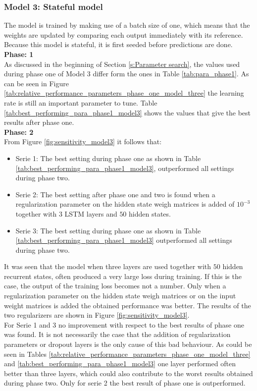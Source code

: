 \newpage
\subsubsection{Model 3: Stateful model}
The model is trained by making use of a batch size of one, which means that the weights are updated by comparing each output immediately with its reference. Because this model is stateful, it is first seeded before predictions are done.\\

\textbf{Phase: 1}\\
As discussed in the beginning of Section \ref{s:Parameter search}, the values used during phase one of Model 3 differ form the ones in Table \ref{tab:para_phase1}. As can be seen in Figure \ref{tab:relative_performance_parameters_phase_one_model_three} the learning rate is still an important parameter to tune. Table \ref{tab:best_performing_para_phase1_model3} shows the values that give the best results after phase one.\\ 

\textbf{Phase: 2}\\
From Figure \ref{fig:sensitivity_model3} it follows that:
\begin{itemize}
	\item Serie 1: The best setting during phase one as shown in Table \ref{tab:best_performing_para_phase1_model3}, outperformed all settings during phase two. 
	\item Serie 2: The best setting after phase one and two is found when a regularization parameter on the hidden state weigh matrices is added of $ 10^{-3} $ together with $ 3 $ LSTM layers and $ 50 $ hidden states.
	\item Serie 3: The best setting during phase one as shown in Table \ref{tab:best_performing_para_phase1_model3} outperformed all settings during phase two. 
\end{itemize}

It was seen that the model when three layers are used together with $ 50 $ hidden recurrent states, often produced a very large loss during training. If this is the case, the output of the training loss becomes not a number. Only when a regularization parameter on the hidden state weigh matrices or on the input weight matrices is added the obtained performance was better. The results of the two regularizers are shown in Figure \ref{fig:sensitivity_model3}.\\

For Serie 1 and 3 no improvement with respect to the best results of phase one was found. It is not necessarily the case that the addition of regularization parameters or dropout layers is the only cause of this bad behaviour. As could be seen in Tables \ref{tab:relative_performance_parameters_phase_one_model_three} and \ref{tab:best_performing_para_phase1_model3} one layer performed often better than three layers, which could also contribute to the worst results obtained during phase two. Only for serie 2 the best result of phase one is outperformed. \\

